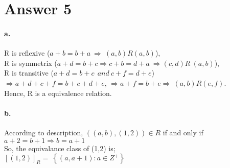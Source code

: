 \documentclass[11pt]{article}
\begin{document}
\newpage
\section*{Answer 5}
\paragraph{a.}
R is reflexive ($a+b=b+a\:\Rightarrow \:\left(a,b\right)R\left(a,b\right)$), \\
R is symmetrix ($a+d=b+c\Rightarrow c+b=d+a\:\Rightarrow\left(c,d\right)R\:\left(a,b\right)$), \\
R is transitive ($a+d=b+c\:\:and\:c+f=d+e$) \\
$\Rightarrow a+d+c+f=b+c+d+e$,
$\Rightarrow a+f=b+e\Rightarrow\:\left(a,b\right)R\left(e,f\right)$. \\
Hence, R is a equivalence relation. 

\paragraph{b.}
According to description, $\left(\left(a,b\right),\left(1,2\right)\right)\in R$ if and only if $a+2=b+1\Rightarrow b=a+1$ \\
So, the equivalance class of (1,2) is; \\
$\left[\left(1,2\right)\right]_R=\:\left\{\left(a,a+1\right):a\in Z^+\right\}$ \\
\end{document}
